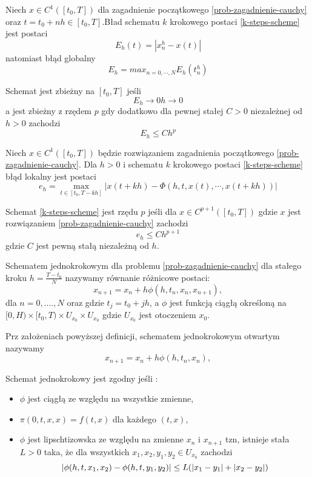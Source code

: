 \documentclass[12pt,a4paper]{report}
\begin{document}
\begin{definition}  
Niech $ x \in C^{1}([t_0,T])$ dla zagadnienie początkowego \ref{prob-zagadnienie-cauchy} oraz $t=t_0 +nh \in [t_0,T]$.Bład schematu $k$ krokowego postaci \ref{k-steps-scheme} jest postaci 
$$
E_h(t) = |x^{h}_{n} - x(t)|
$$ 
natomiast błąd globalny 
$$
E_h = max_{n=0,\cdots,N} E_h(t^{h}_{n})
$$
\end{definition}
\begin{definition}
Schemat jest zbieżny na $[t_0,T]$ jeśli 
$$
E_h \to 0  h \to 0
$$
a jest zbieżny z rzędem $p$ gdy dodatkowo dla pewnej stałej $C>0$ niezależnej od $h>0$ zachodzi 
$$
E_h \leq C h^p
$$
\end{definition}
\begin{definition}
Niech $x \in C^1([t_0,T]) $ będzie rozwiązaniem zagadnienia początkowego \ref{prob-zagadnienie-cauchy}. Dla $h>0$ i schematu $k$ krokowego postaci \ref{k-steps-scheme} błąd lokalny jest postaci
\begin{equation}
e_h = \max_{t \in [t_0,T-kh]} |x(t + kh) - \Phi (h,t,x(t),\cdots, x(t + kh))|
\end{equation}
\end{definition}
\begin{definition} 
Schemat \ref{k-steps-scheme} jest rzędu $p$ jeśli dla $x \in C^{p+1}([t_0,T])$ gdzie $x$ jest rozwiązaniem \ref{prob-zagadnienie-cauchy} zachodzi
$$
e_h \leq C h^{p+1}
$$
gdzie $C$ jest pewną stałą niezależną od $h$. 
\end{definition}
\begin{definition}  
Schematem jednokrokowym dla problemu \ref{prob-zagadnienie-cauchy} dla stałego kroku $h = \frac{T-t_0}{N}$ nazywamy równanie różnicowe postaci:
$$
x_{n+1} = x_n + h \phi(h,t_{n},x_{n},x_{n+1}),  
$$
dla $n = 0,....,N$ oraz gdzie $t_{j} = t_{0} + jh$, a $\phi$ jest funkcją ciągłą określoną na $[0,H) \times [t_0,T) \times U_{x_0} \times U_{x_0} $ gdzie $ U_{x_0} $ jest otoczeniem $x_0$.   
\end{definition}
\begin{definition}
Prz założeniach powyższej definicji, schematem jednokrokowym otwartym nazywamy 
$$
x_{n+1} = x_n + h \phi(h,t_{n},x_{n}),  
$$
\end{definition}
 
\begin{definition}\label{definition-consistency}
Schemat jednokrokowy jest zgodny jeśli :
\begin{itemize}
\item $\phi$ jest ciągłą ze względu na wszystkie zmienne,
\item $\pi(0,t,x,x) = f(t,x)$ dla każdego $(t,x)$,
\item $\phi$ jest lipschtizowska ze względu na zmienne $x_n$ i $x_{n+1}$ tzn, istnieje stała $L>0$ taka, że dla wszystkich $x_1,x_2,y_1,y_2 \in U_{x_0}$ zachodzi
$$
{\left| {\phi(h,t,x_1,x_2) - \phi(h,t,y_1,y_2)} \right|} \leq L  ( {\left| {x_1 - y_1} \right|} + {\left| {x_2 - y_2} \right|})
$$
\end{itemize}

\end{definition}
\end{document}
